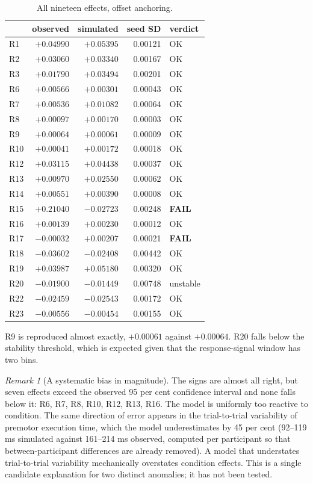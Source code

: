 \documentclass[11pt,a4paper]{article}
\theoremstyle{plain}
\theoremstyle{remark}
\newtheorem{remark}{Remark}
\begin{document}
\begin{table}[htbp]
\centering
\caption{All nineteen effects, offset anchoring.}
\label{tab:eff}
\begin{tabular}{lrrrl}
\toprule
& observed & simulated & seed SD & verdict\\
\midrule
R1 & $+0.04990$ & $+0.05395$ & 0.00121 & OK\\
R2 & $+0.03060$ & $+0.03340$ & 0.00167 & OK\\
R3 & $+0.01790$ & $+0.03494$ & 0.00201 & OK\\
R6 & $+0.00566$ & $+0.00301$ & 0.00043 & OK\\
R7 & $+0.00536$ & $+0.01082$ & 0.00064 & OK\\
R8 & $+0.00097$ & $+0.00170$ & 0.00003 & OK\\
R9 & $+0.00064$ & $+0.00061$ & 0.00009 & OK\\
R10 & $+0.00041$ & $+0.00172$ & 0.00018 & OK\\
R12 & $+0.03115$ & $+0.04438$ & 0.00037 & OK\\
R13 & $+0.00970$ & $+0.02550$ & 0.00062 & OK\\
R14 & $+0.00551$ & $+0.00390$ & 0.00008 & OK\\
R15 & $+0.21040$ & $-0.02723$ & 0.00248 & \textbf{FAIL}\\
R16 & $+0.00139$ & $+0.00230$ & 0.00012 & OK\\
R17 & $-0.00032$ & $+0.00207$ & 0.00021 & \textbf{FAIL}\\
R18 & $-0.03602$ & $-0.02408$ & 0.00442 & OK\\
R19 & $+0.03987$ & $+0.05180$ & 0.00320 & OK\\
R20 & $-0.01900$ & $-0.01449$ & 0.00748 & unstable\\
R22 & $-0.02459$ & $-0.02543$ & 0.00172 & OK\\
R23 & $-0.00556$ & $-0.00454$ & 0.00155 & OK\\
\bottomrule
\end{tabular}
\end{table}

R9 is reproduced almost exactly, $+0.00061$ against $+0.00064$. R20 falls below the
stability threshold, which is expected given that the response-signal window has two bins.

\begin{remark}[A systematic bias in magnitude]
The signs are almost all right, but seven effects exceed the observed 95 per cent confidence
interval and none falls below it: R6, R7, R8, R10, R12, R13, R16. The model is uniformly too
reactive to condition. The same direction of error appears in the trial-to-trial variability
of premotor execution time, which the model underestimates by 45 per cent (92--119 ms
simulated against 161--214 ms observed, computed per participant so that between-participant
differences are already removed). A model that understates trial-to-trial variability
mechanically overstates condition effects. This is a single candidate explanation for two
distinct anomalies; it has not been tested.
\end{remark}
\end{document}
